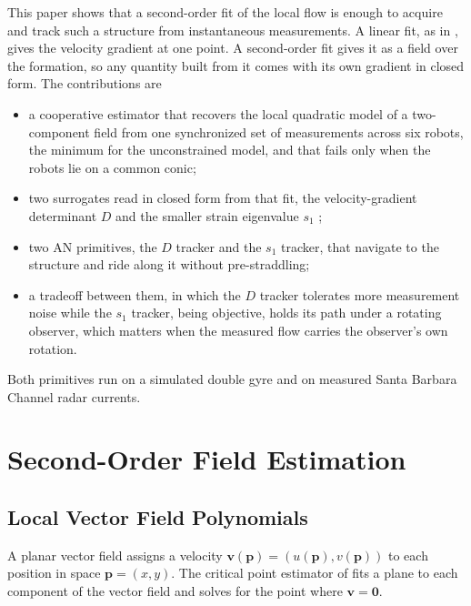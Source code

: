 \documentclass[lettersize,journal]{IEEEtran}
\begin{document}
This paper shows that a second-order fit of the local flow is enough to
acquire and track such a structure from instantaneous measurements. A
linear fit, as in \cite{10}, gives the velocity gradient at one point. A
second-order fit gives it as a field over the formation, so any quantity
built from it comes with its own gradient in closed form. The contributions are
\begin{itemize}
\item a cooperative estimator that recovers the local quadratic model of
a two-component field from one synchronized set of measurements across six robots, the
minimum for the unconstrained model, and that fails only when the robots
lie on a common conic;
\item two surrogates read in closed form from that fit, the
velocity-gradient determinant $D$ and the smaller strain eigenvalue
$s_1$ \cite{19};
\item two AN primitives, the $D$ tracker and the $s_1$ tracker, that
navigate to the structure and ride along it without pre-straddling;
\item a tradeoff between them, in which the $D$ tracker tolerates more
measurement noise while the $s_1$ tracker, being objective, holds its
path under a rotating observer, which matters when the measured flow
carries the observer's own rotation.
\end{itemize}

Both primitives run on a simulated double gyre and on measured Santa
Barbara Channel radar currents.

\section{Second-Order Field Estimation}

\subsection{Local Vector Field Polynomials}

A planar vector field assigns a velocity $\mathbf{v}(\mathbf{p}) =
(u(\mathbf{p}), v(\mathbf{p}))$ to each position in space $\mathbf{p} = (x, y)$.
The critical point estimator of \cite{10} fits a plane to each
component of the vector field and solves for the point where $\mathbf{v} = \mathbf{0}$. 
\end{document}
